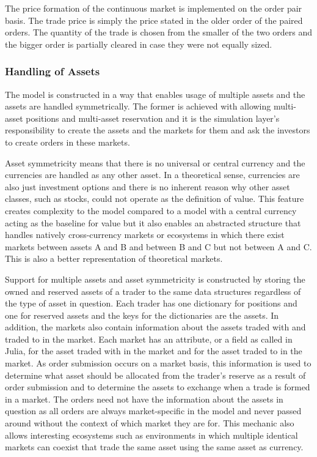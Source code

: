 The price formation of the continuous market is implemented
on the order pair basis. The trade price is simply the price
stated in the older order of the paired orders. %
The quantity of the trade is chosen from the smaller of the two orders
and the bigger order is partially cleared in case they were not 
equally sized.



\subsubsection{Handling of Assets}

The model is constructed in a way that enables usage of multiple assets
and the assets are handled symmetrically. The former is achieved with
allowing multi-asset positions and multi-asset reservation and 
it is the simulation layer's responsibility to create the assets and the 
markets for them and ask the investors to create orders in these markets. 

Asset symmetricity means that there is no universal or central currency 
and the currencies are handled as any other asset. In a theoretical sense, 
currencies are also just investment options and there is no inherent reason why other 
asset classes, such as stocks, could not operate as the definition 
of value. This feature creates complexity to the model compared to a model
with a central currency acting as the baseline for value but it also enables an
abstracted structure that handles natively cross-currency
markets or ecosystems in which there exist markets between assets A and 
B and between B and C but not between A and C. This is also a better 
representation of theoretical markets.

Support for multiple assets and asset symmetricity is constructed by storing 
the owned and reserved assets of a trader to the same data structures regardless
of the type of asset in question. Each trader has one dictionary for positions 
and one for reserved assets and the keys for the dictionaries are the assets. 
In addition, the markets also contain information about the assets traded with and traded to 
in the market. Each market has an attribute, or a field as called
in Julia, for the asset traded with in the market and for the asset
traded to in the market. As order submission occurs on a market basis, this information
is used to determine what asset should be allocated from the trader's reserve as a result of 
order submission and to determine the assets to exchange when a trade is formed in a market. 
The orders need not have the information about the assets in question as all orders are always
market-specific in the model and never passed around without the context of which market they are 
for. This mechanic also allows interesting ecosystems such as environments
in which multiple identical markets can coexist that trade the same asset using the same asset as
currency. 

